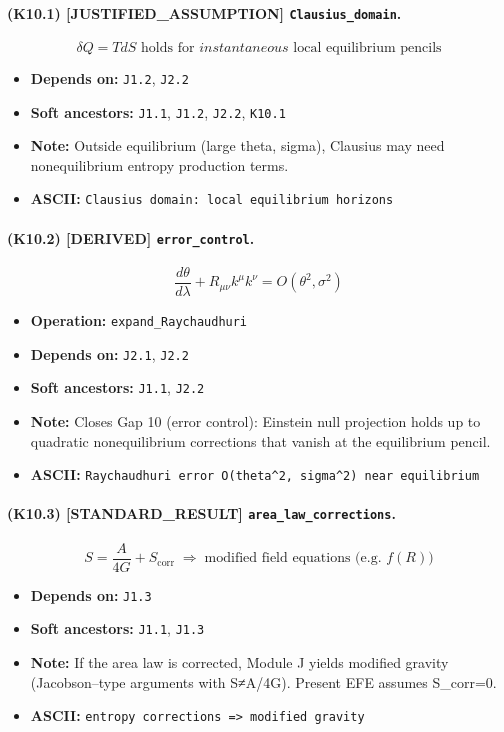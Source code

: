 \documentclass[11pt,a4paper]{article}
\theoremstyle{remark}\newtheorem*{caution}{Caution}
\newcommand{\tagbox}[1]{\textsc{[#1]}}
\begin{document}
\paragraph{(K10.1) \tagbox{JUSTIFIED\_ASSUMPTION} \texttt{Clausius\_domain}.}
\begin{equation}
\delta Q=T dS\text{ holds for }instantaneous\text{ local equilibrium pencils}
\tag{K10.1}
\end{equation}
\begin{itemize}\setlength{\itemsep}{0.12em}
\item \textbf{Depends on:} \texttt{J1.2}, \texttt{J2.2}
\item \textbf{Soft ancestors:} \texttt{J1.1}, \texttt{J1.2}, \texttt{J2.2}, \texttt{K10.1}
\item \textbf{Note:} Outside equilibrium (large theta, sigma), Clausius may need nonequilibrium entropy production terms.
\item \textbf{ASCII:} \texttt{Clausius domain: local equilibrium horizons}
\end{itemize}
\paragraph{(K10.2) \tagbox{DERIVED} \texttt{error\_control}.}
\begin{equation}
\frac{d\theta}{d\lambda}+R_{\mu\nu}k^\mu k^\nu=O(\theta^2,\sigma^2)
\tag{K10.2}
\end{equation}
\begin{itemize}\setlength{\itemsep}{0.12em}
\item \textbf{Operation:} \texttt{expand\_Raychaudhuri}
\item \textbf{Depends on:} \texttt{J2.1}, \texttt{J2.2}
\item \textbf{Soft ancestors:} \texttt{J1.1}, \texttt{J2.2}
\item \textbf{Note:} Closes Gap 10 (error control): Einstein null projection holds up to quadratic nonequilibrium corrections that vanish at the equilibrium pencil.
\item \textbf{ASCII:} \texttt{Raychaudhuri error O(theta^2, sigma^2) near equilibrium}
\end{itemize}
\paragraph{(K10.3) \tagbox{STANDARD\_RESULT} \texttt{area\_law\_corrections}.}
\begin{equation}
S=\frac{A}{4G}+S_{\mathrm{corr}}\;\Rightarrow\;\text{modified field equations (e.g. }f(R)\text{)}
\tag{K10.3}
\end{equation}
\begin{itemize}\setlength{\itemsep}{0.12em}
\item \textbf{Depends on:} \texttt{J1.3}
\item \textbf{Soft ancestors:} \texttt{J1.1}, \texttt{J1.3}
\item \textbf{Note:} If the area law is corrected, Module J yields modified gravity (Jacobson–type arguments with S≠A/4G). Present EFE assumes S\_corr=0.
\item \textbf{ASCII:} \texttt{entropy corrections => modified gravity}
\end{itemize}
\end{document}
